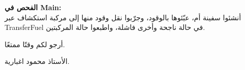\documentclass[14pt]{extarticle}
\begin{document}
\begin{enumerate}[label=\textbf{تمرين \arabic*:}, wide=0pt, leftmargin=*, itemsep=2.2em]
    \vspace{2em}
    \noindent \textbf{الفحص في \textenglish{Main}:} \\
    أنشئوا سفينة أم، عبّئوها بالوقود، وجرّبوا نقل وقود منها إلى مركبة استكشاف عبر \textenglish{TransferFuel} في حالة ناجحة وأخرى فاشلة، واطبعوا حالة المركبتين.

\end{enumerate}

\vspace{1cm}
\begin{flushleft}
أرجو لكم وقتًا ممتعًا.

الأستاذ محمود اغبارية.
\end{flushleft}
\end{document}
